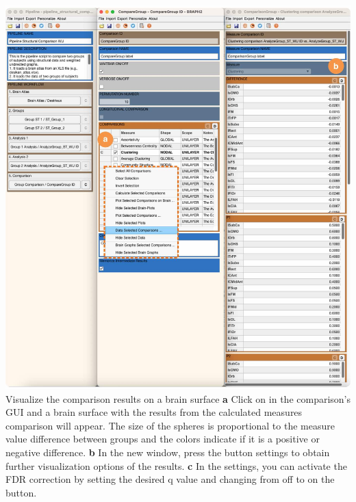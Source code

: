 \documentclass[justified]{tufte-handout}
\begin{document}
	{
	\includegraphics{fig10.jpg}
	}
 	{Visualize the comparison results on a brain surface}
 	{
 	{\bf a} Click on  in the comparison's GUI and a brain surface with the results from the calculated measures comparison will appear. The size of the spheres is proportional to the measure value difference between groups and the colors indicate if it is a positive or negative difference.   
        {\bf b} In the new window, press the button settings to obtain further visualization options of the results. 
        {\bf c} In the settings, you can activate the FDR correction by setting the desired q value and changing from off to on the button.
        }
\end{document}
